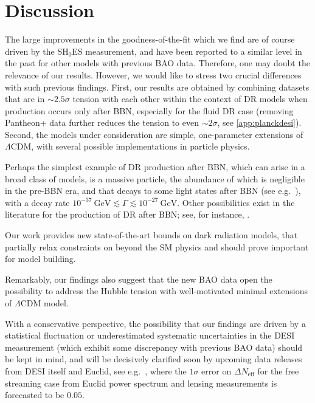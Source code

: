 \documentclass[aps,prd,twocolumn,notitlepage,
superscriptaddress,
nofootinbib,floatfix]{revtex4-2}
\begin{document}

\section{Discussion}\label{sec:discussions}

The large improvements in the goodness-of-the-fit which we find are of course driven by the SH$_0$ES measurement, and have been reported to a similar level in the past for other models with previous BAO data. Therefore, one may doubt the relevance of our results. However, we would like to stress two crucial differences with such previous findings. First, our results are obtained by combining datasets that are in $\sim 2.5\sigma$ tension with each other within the context of DR models when production occurs only after BBN, especially for the fluid DR case (removing Pantheon+ data further reduces the tension to even $\sim2\sigma$, see \cref{app:planckdesi}). Second, the models under consideration are simple, one-parameter extensions of $\Lambda$CDM, with several possible implementations in particle physics. 

Perhaps the simplest example of DR production after BBN, which can arise in a broad class of models, is a massive particle, the abundance of which is negligible in the pre-BBN era, and that decays to some light states after BBN (see e.g.~\cite{Ichikawa:2007jv, Fischler:2010xz, Hooper:2011aj, Bjaelde:2012wi, Choi:2012zna, Hasenkamp:2012ii, Sobotka:2023bzr}),
with a decay rate 
$10^{-37}~\text{GeV}\lesssim\Gamma\lesssim 10^{-27}~\text{GeV}$.
Other possibilities exist in the literature for the production of DR after BBN; see, for instance, \cite{Ferreira:2022zzo, Aloni:2023tff, Garny:2024ums}.


Our work provides new state-of-the-art bounds on dark radiation models, that partially relax constraints on beyond the SM physics and should prove important for model building.

Remarkably, our findings also suggest that the new BAO data open the possibility to address the Hubble tension with well-motivated minimal extensions of $\Lambda$CDM model. 

With a conservative perspective, the possibility that our findings are driven by a statistical fluctuation or underestimated systematic uncertainties in the DESI measurement (which exhibit some discrepancy with previous BAO data) should be kept in mind, and will be decisively clarified soon by upcoming data releases from DESI itself and Euclid, see e.g.~\cite{Brinckmann:2018owf}, where the $1\sigma$ error on $\Delta N_\text{eff}$ for the free streaming case from Euclid power spectrum and lensing measurements is forecasted to be $0.05$.
\end{document}
